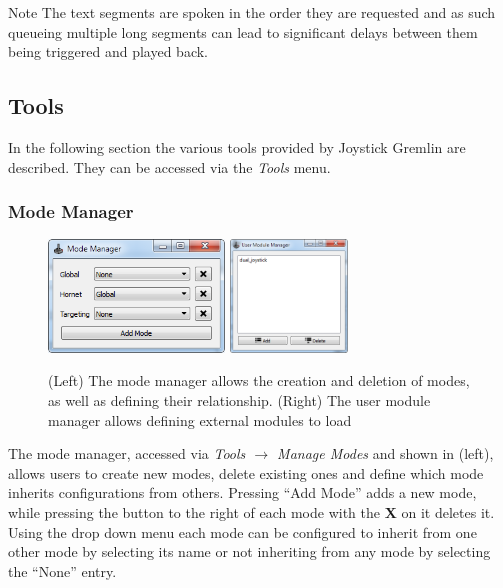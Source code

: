 \documentclass[a4, 10pt]{article}
\newcommand{\JG}{Joystick Gremlin}
\begin{document}
\vspace{1em}
\begin{bclogo}[
    couleur=yellow!40,
    couleurBord=orange!80,
    couleurBarre=orange!80,
    arrondi=0.1,
    logo=\bcinfo
]{Note}
    The text segments are spoken in the order they are requested and as
    such queueing multiple long segments can lead to significant delays
    between them being triggered and played back.
\end{bclogo}

\FloatBarrier


\subsection{Tools}

In the following section the various tools provided by \JG{} are
described. They can be accessed via the \emph{Tools} menu.

\subsubsection{Mode Manager}

\begin{figure}[bt]
    \centering

    \includegraphics[height=3cm]{images/mode_manager}
    \quad
    \includegraphics[height=3cm]{images/module_manager}

    \caption{(Left) The mode manager allows the creation and deletion of
    modes, as well as defining their relationship.  (Right) The user
    module manager allows defining external modules to load}

    \label{fig:mode_module_screens}
\end{figure}

The mode manager, accessed via \emph{Tools $\rightarrow$ Manage Modes}
and shown in  (left), allows users to create
new modes, delete existing ones and define which mode inherits
configurations from others. Pressing ``Add Mode'' adds a new mode, while
pressing the button to the right of each mode with the \textbf{X} on it
deletes it. Using the drop down menu each mode can be configured to
inherit from one other mode by selecting its name or not inheriting from
any mode by selecting the ``None'' entry.
\end{document}

